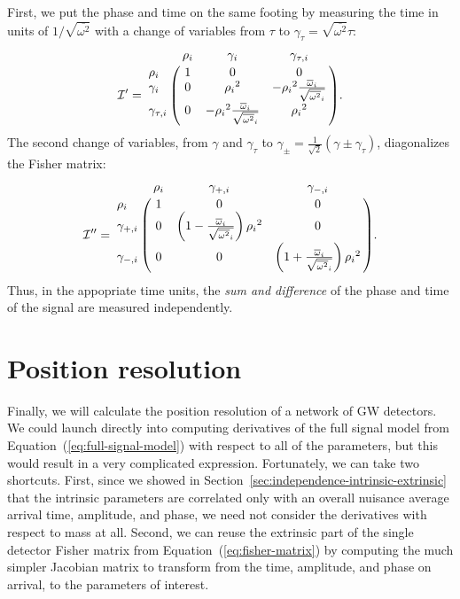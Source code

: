 \documentclass[amsmath,amssymb,aps,prx,reprint,nopreprintnumbers,nofootinbib,showpacs]{revtex4-1}
\begin{document}
First, we put the phase and time on the same footing by measuring the time in units of $1 / \sqrt{\overline{\omega^2}}$ with a change of variables from $\tau$ to $\gamma_\tau = \sqrt{\overline{\omega^2}} \tau$:
%
\begin{equation}
    \mathcal{I}' = \bordermatrix{
        ~ & \rho_i & \gamma_i & \gamma_{\tau,i} \cr
        \rho_i & 1 & 0 & 0 \cr
        \gamma_i & 0 & {\rho_i}^2 & -{\rho_i}^2\frac{{\overline{\omega}}_i}{\sqrt{{\overline{\omega^2}}_i}} \cr
        \gamma_{\tau,i} & 0 & -{\rho_i}^2\frac{{\overline{\omega}}_i}{\sqrt{{\overline{\omega^2}}_i}} & {\rho_i}^2
    }.
\end{equation}
%
The second change of variables, from $\gamma$ and $\gamma_\tau$ to $\gamma_\pm = \frac{1}{\sqrt{2}}(\gamma \pm \gamma_\tau)$, diagonalizes the Fisher matrix:
%
\begin{equation}\label{eq:fisher-matrix-extrinsic-one-detector}
    \mathcal{I}'' = \bordermatrix{
        ~ & \rho_i & \gamma_{+,i} & \gamma_{-,i} \cr
        \rho_i & 1 & 0 & 0 \cr
        \gamma_{+,i} & 0 & \left(1 - \frac{\overline{\omega}_i}{\sqrt{\overline{\omega^2}_i}}\right){\rho_i}^2 & 0 \cr
        \gamma_{-,i} & 0 & 0 & \left(1 + \frac{\overline{\omega}_i}{\sqrt{\overline{\omega^2}_i}}\right){\rho_i}^2
    }.
\end{equation}
%
Thus, in the appopriate time units, the \textit{sum and difference} of the phase and time of the signal are measured independently.

\section{Position resolution}
\label{sec:position-resolution}

Finally, we will calculate the position resolution of a network of \ac{GW} detectors. We could launch directly into computing derivatives of the full signal model from Equation~(\ref{eq:full-signal-model}) with respect to all of the parameters, but this would result in a very complicated expression. Fortunately, we can take two shortcuts. First, since we showed in Section~\ref{sec:independence-intrinsic-extrinsic} that the intrinsic parameters are correlated only with an overall nuisance average arrival time, amplitude, and phase, we need not consider the derivatives with respect to mass at all. Second, we can reuse the extrinsic part of the single detector Fisher matrix from Equation~(\ref{eq:fisher-matrix}) by computing the much simpler Jacobian matrix to transform from the time, amplitude, and phase on arrival, to the parameters of interest.
\end{document}
